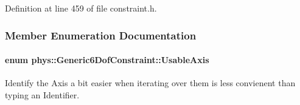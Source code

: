 Definition at line 459 of file constraint.h.



\subsubsection{Member Enumeration Documentation}
\hypertarget{classphys_1_1Generic6DofConstraint_a70c7ba15366ae33deaf8e042b32f8e02}{
\paragraph[{UsableAxis}]{\setlength{\rightskip}{0pt plus 5cm}enum {\bf phys::Generic6DofConstraint::UsableAxis}}\hfill}
\label{classphys_1_1Generic6DofConstraint_a70c7ba15366ae33deaf8e042b32f8e02}


Identify the Axis a bit easier when iterating over them is less convienent than typing an Identifier. 

